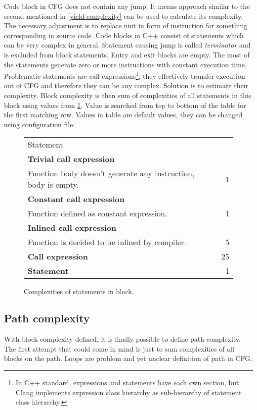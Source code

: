 Code block in CFG does not contain any jump. It means approach similar to the second mentioned in \ref{yield-complexity} can be used to calculate its complexity. The necessary adjustment is to replace unit in form of instruction for something corresponding in source code. Code blocks in C++ consist of statements which can be very complex in general. Statement causing  jump is called \emph{terminator} and is excluded from block statements. Entry and exit blocks are empty. The most of the statements generate zero or more instructions with constant execution time. Problematic statements are call expressions\footnote{In C++ standard, expressions and statements have each own section, but Clang implements expression class hierarchy as sub-hierarchy of statement class hierarchy.}, they effectively transfer execution out of CFG and therefore they can be any complex. Solution is to estimate their complexity. Block complexity is then sum of complexities of all statements in this block using values from \ref{yield-block}. Value is searched from top to bottom of the table for the first matching row. Values in table are default values, they can be changed using configuration file.

\begin{figure}[h!]
\caption{Complexities of statements in block.}
\label{yield-block}
\vspace{0.5cm}
\renewcommand{\arraystretch}{1.1}
\centering
\begin{tabular}{ l | r }
  \cellcolor[gray]{0.9}Statement & \cellcolor[gray]{0.9} \\
  \textbf{Trivial call expression}\\Function body doesn't generate any instruction, body is empty. & 1 \\
  \textbf{Constant call expression}\\Function defined as constant expression. & 1 \\
  \textbf{Inlined call expression}\\Function is decided to be inlined by compiler. & 5 \\
  \cellcolor[gray]{0.9}\textbf{Call expression} & \cellcolor[gray]{0.9}25 \\
  \cellcolor[gray]{0.9}\textbf{Statement} & \cellcolor[gray]{0.9}1 \\
\end{tabular}
\end{figure}

\subsection{Path complexity}
With block complexity defined, it is finally possible to define path complexity. The first attempt that could come in mind is just to sum complexities of all blocks on the path. Loops are problem and yet unclear definition of path in CFG.

